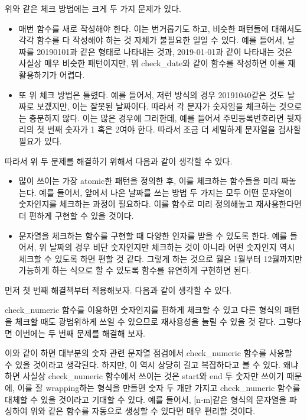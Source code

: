 \documentclass[twoside]{article}
\newcommand\code[4]{
}
\begin{document}
\code{check dates}{checkdate.py}{1}{5}

위와 같은 체크 방법에는 크게 두 가지 문제가 있다. 
\begin{itemize}
\item 매번 함수를 새로 작성해야 한다. 이는 번거롭기도 하고, 비슷한 패턴들에 대해서도 각각 함수를 다 작성해야 하는 것 자체가 불필요한 일일 수 있다. 예를 들어서, 날짜를 20190101과 같은 형태로 나타내는 것과, 2019-01-01과 같이 나타내는 것은 사실상 매우 비슷한 패턴이지만, 위 check\_date와 같이 함수를 작성하면 이를 재활용하기가 어렵다. 
\item 또 위 체크 방법은 틀렸다. 예를 들어서, 저런 방식의 경우 20191040같은 것도 날짜로 보겠지만, 이는 잘못된 날짜이다. 따라서 각 문자가 숫자임을 체크하는 것으로는 충분하지 않다. 이는 많은 경우에 그러한데, 예를 들어서 주민등록번호라면 뒷자리의 첫 번째 숫자가 1 혹은 2여야 한다. 따라서 조금 더 세밀하게 문자열을 검사할 필요가 있다. 
\end{itemize}

따라서 위 두 문제를 해결하기 위해서 다음과 같이 생각할 수 있다. 

\begin{itemize} 
\item 많이 쓰이는 가장 atomic한 패턴을 정의한 후, 이를 체크하는 함수들을 미리 짜놓는다. 예를 들어서,  앞에서 나온 날짜를 쓰는 방법 두 가지는 모두 어떤 문자열이 숫자인지를 체크하는 과정이 필요하다. 이를 함수로 미리 정의해놓고 재사용한다면 더 편하게 구현할 수 있을 것이다. 
\item 문자열을 체크하는 함수를 구현할 때 다양한 인자를 받을 수 있도록 한다. 예를 들어서, 위 날짜의 경우 비단 숫자인지만 체크하는 것이 아니라 어떤 숫자인지 역시 체크할 수 있도록 하면 편할 것 같다. 그렇게 하는 것으로 월은 1월부터 12월까지만 가능하게 하는 식으로 할 수 있도록 함수를 유연하게 구현하면 된다. 
\end{itemize}

먼저 첫 번째 해결책부터 적용해보자. 다음과 같이 생각할 수 있다. 

\code{check\_numeric 함수 추가}{checkdate.py}{7}{13}

check\_numeric  함수를 이용하면 숫자인지를 편하게 체크할 수 있고 다른 형식의 패턴을 체크할 때도 광범위하게 쓰일 수 있으므로 재사용성을 늘릴 수 있을 것 같다. 그렇다면 이번에는 두 번째 문제를 해결해 보자. 

\code{check\_numeric 함수 추가}{checkdate.py}{15}{31}

이와 같이 하면 대부분의 숫자 관련 문자열 점검에서 check\_numeric 함수를 사용할 수 있을 것이라고 생각된다. 하지만, 이 역시 상당히 길고 복잡하다고 볼 수 있다. 왜냐하면 사실상 check\_numeric 함수에서 쓰이는 것은 start와 end 두 숫자만 쓰이기 때문에, 이를 잘 wrapping하는 형식을 만들면 숫자 두 개만 가지고 check\_numeric 함수를 대체할 수 있을 것이라고 기대할 수 있다. 예를 들어서, [n-m]같은 형식의 문자열을 파싱하여 위와 같은 함수를 자동으로 생성할 수 있다면 매우 편리할 것이다. 
\end{document}
